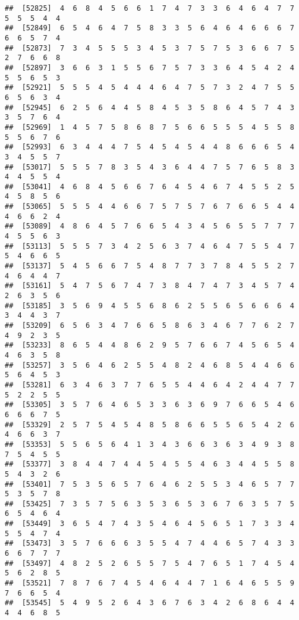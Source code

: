 \documentclass[
]{book}
\begin{document}
\begin{verbatim}
##  [52825]  4  6  8  4  5  6  6  1  7  4  7  3  3  6  4  6  4  7  7  5  5  5  4  4
##  [52849]  6  5  4  6  4  7  5  8  3  3  5  6  4  6  4  6  6  6  7  6  6  5  7  4
##  [52873]  7  3  4  5  5  5  3  4  5  3  7  5  7  5  3  6  6  7  5  2  7  6  6  8
##  [52897]  3  6  6  3  1  5  5  6  7  5  7  3  3  6  4  5  4  2  4  5  5  6  5  3
##  [52921]  5  5  5  4  5  4  4  4  6  4  7  5  7  3  2  4  7  5  5  6  5  6  3  4
##  [52945]  6  2  5  6  4  4  5  8  4  5  3  5  8  6  4  5  7  4  3  3  5  7  6  4
##  [52969]  1  4  5  7  5  8  6  8  7  5  6  6  5  5  5  4  5  5  8  5  5  6  7  6
##  [52993]  6  3  4  4  4  7  5  4  5  4  5  4  4  8  6  6  6  5  4  3  4  5  5  7
##  [53017]  5  5  5  7  8  3  5  4  3  6  4  4  7  5  7  6  5  8  3  4  4  5  5  4
##  [53041]  4  6  8  4  5  6  6  7  6  4  5  4  6  7  4  5  5  2  5  4  5  8  5  6
##  [53065]  5  5  5  4  4  6  6  7  5  7  5  7  6  7  6  6  5  4  4  4  6  6  2  4
##  [53089]  4  8  6  4  5  7  6  6  5  4  3  4  5  6  5  5  7  7  7  4  5  5  6  3
##  [53113]  5  5  5  7  3  4  2  5  6  3  7  4  6  4  7  5  5  4  7  5  4  6  6  5
##  [53137]  5  4  5  6  6  7  5  4  8  7  7  3  7  8  4  5  5  2  7  4  6  4  4  7
##  [53161]  5  4  7  5  6  7  4  7  3  8  4  7  4  7  3  4  5  7  4  2  6  3  5  6
##  [53185]  3  5  6  9  4  5  5  6  8  6  2  5  5  6  5  6  6  6  4  3  4  4  3  7
##  [53209]  6  5  6  3  4  7  6  6  5  8  6  3  4  6  7  7  6  2  7  4  9  2  3  5
##  [53233]  8  6  5  4  4  8  6  2  9  5  7  6  6  7  4  5  6  5  4  4  6  3  5  8
##  [53257]  3  5  6  4  6  2  5  5  4  8  2  4  6  8  5  4  4  6  6  5  6  4  5  3
##  [53281]  6  3  4  6  3  7  7  6  5  5  4  4  6  4  2  4  4  7  7  5  2  2  5  5
##  [53305]  3  5  7  6  4  6  5  3  3  6  3  6  9  7  6  6  5  4  6  6  6  6  7  5
##  [53329]  2  5  7  5  4  5  4  8  5  8  6  6  5  5  6  5  4  2  6  4  6  6  3  7
##  [53353]  5  5  6  5  6  4  1  3  4  3  6  6  3  6  3  4  9  3  8  7  5  4  5  5
##  [53377]  3  8  4  4  7  4  4  5  4  5  5  4  6  3  4  4  5  5  8  5  4  3  2  6
##  [53401]  7  5  3  5  6  5  7  6  4  6  2  5  5  3  4  6  5  7  7  5  3  5  7  8
##  [53425]  7  3  5  7  5  6  3  5  3  6  5  3  6  7  6  3  5  7  5  6  5  4  6  4
##  [53449]  3  6  5  4  7  4  3  5  4  6  4  5  6  5  1  7  3  3  4  5  5  4  7  4
##  [53473]  3  5  7  6  6  6  3  5  5  4  7  4  4  6  5  7  4  3  3  6  6  7  7  7
##  [53497]  4  8  2  5  2  6  5  5  7  5  4  7  6  5  1  7  4  5  4  5  6  2  8  5
##  [53521]  7  8  7  6  7  4  5  4  6  4  4  7  1  6  4  6  5  5  9  7  6  6  5  4
##  [53545]  5  4  9  5  2  6  4  3  6  7  6  3  4  2  6  8  6  4  4  4  4  6  8  5

\end{verbatim}
\end{document}

